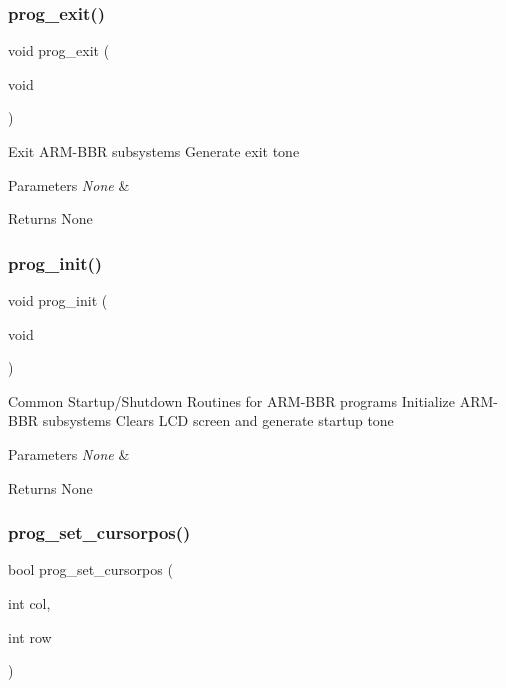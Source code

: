 \subsubsection{\texorpdfstring{prog\+\_\+exit()}{prog\_exit()}}
{\footnotesize\ttfamily void prog\+\_\+exit (\begin{DoxyParamCaption}\item[{void}]{ }\end{DoxyParamCaption})}

Exit A\+R\+M-\/\+B\+BR subsystems Generate exit tone 
\begin{DoxyParams}{Parameters}
{\em None} & \\
\hline
\end{DoxyParams}
\begin{DoxyReturn}{Returns}
None 
\end{DoxyReturn}
\mbox{\label{group__scaffolding_gadc1bdbe20a5b0bf20b786c454857af1a}} 
\subsubsection{\texorpdfstring{prog\+\_\+init()}{prog\_init()}}
{\footnotesize\ttfamily void prog\+\_\+init (\begin{DoxyParamCaption}\item[{void}]{ }\end{DoxyParamCaption})}

Common Startup/\+Shutdown Routines for A\+R\+M-\/\+B\+BR programs Initialize A\+R\+M-\/\+B\+BR subsystems Clears L\+CD screen and generate startup tone 
\begin{DoxyParams}{Parameters}
{\em None} & \\
\hline
\end{DoxyParams}
\begin{DoxyReturn}{Returns}
None 
\end{DoxyReturn}
\mbox{\label{group__scaffolding_ga0420c11494d215979edc5f657819a2ca}} 
\subsubsection{\texorpdfstring{prog\+\_\+set\+\_\+cursorpos()}{prog\_set\_cursorpos()}}
{\footnotesize\ttfamily bool prog\+\_\+set\+\_\+cursorpos (\begin{DoxyParamCaption}\item[{int}]{col,  }\item[{int}]{row }\end{DoxyParamCaption})}

